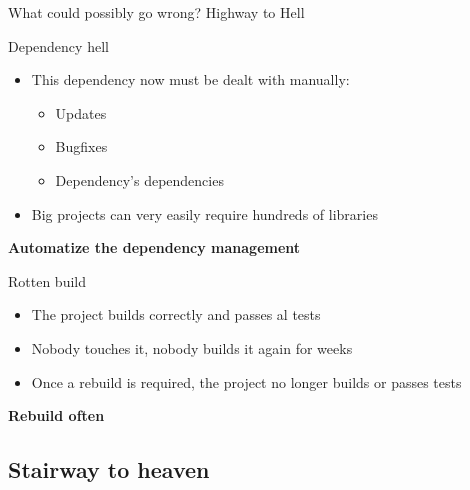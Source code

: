 \documentclass[presentation]{beamer}
\begin{document}
\begin{frame}{What could possibly go wrong? Highway to Hell }
\begin{block}{Dependency hell}
\begin{itemize}
			\item This dependency now must be dealt with manually:
			\begin{itemize}
				\item Updates
				\item Bugfixes
				\item Dependency's dependencies
			\end{itemize}
			\item Big projects can very easily require hundreds of libraries
		\end{itemize}
		\textbf{Automatize the dependency management}
	\end{block}
	\begin{block}{Rotten build}
		\begin{itemize}
			\item The project builds correctly and passes al tests
			\item Nobody touches it, nobody builds it again for weeks
			\item Once a rebuild is required, the project no longer builds or passes tests
		\end{itemize}
		\textbf{Rebuild often}
	\end{block}
\end{frame}

\subsection{Stairway to heaven}
\end{document}
